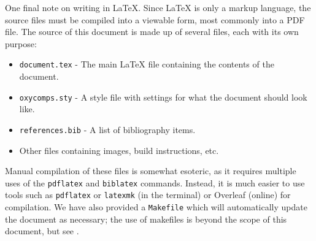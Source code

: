 \documentclass[10pt,twocolumn]{article}
\begin{document}
One final note on writing in LaTeX.
Since LaTeX is only a markup language, the source files must be compiled into a viewable form, most commonly into a PDF file.
The source of this document is made up of several files, each with its own purpose:
\begin{itemize}
    \item \texttt{document.tex} - The main LaTeX file containing the contents of the document.
    \item \texttt{oxycomps.sty} - A style file with settings for what the document should look like.
    \item \texttt{references.bib} - A list of bibliography items.
    \item Other files containing images, build instructions, etc.
\end{itemize}
Manual compilation of these files is somewhat esoteric, as it requires multiple uses of the \texttt{pdflatex} and \texttt{biblatex} commands.
Instead, it is much easier to use tools such as \texttt{pdflatex} or \texttt{latexmk} (in the terminal) or Overleaf (online) for compilation.
We have also provided a \texttt{Makefile} which will automatically update the document as necessary; the use of makefiles is beyond the scope of this document, but see \textcite{Lambert2021MakefileTutorial}.

\end{document}
